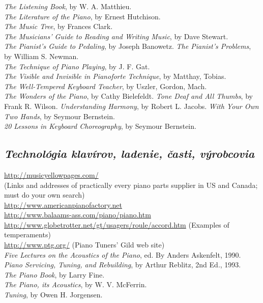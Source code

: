 \textit{The Listening Book}, by W. A. Matthieu.\\
\textit{The Literature of the Piano}, by Ernest Hutchison.\\
\textit{The Music Tree}, by Frances Clark.\\
\textit{The Musicians' Guide to Reading and Writing Music}, by Dave Stewart.\\
\textit{The Pianist's Guide to Pedaling}, by Joseph Banowetz.
\textit{The Pianist's Problems}, by William S. Newman.\\
\textit{The Technique of Piano Playing}, by J. F. Gat.\\
\textit{The Visible and Invisible in Pianoforte Technique}, by Matthay, Tobias.\\
\textit{The Well-Tempered Keyboard Teacher}, by Uszler, Gordon, Mach.\\
\textit{The Wonders of the Piano}, by Cathy Bielefeldt.
\textit{Tone Deaf and All Thumbs}, by Frank R. Wilson.
\textit{Understanding Harmony}, by Robert L. Jacobs.
\textit{With Your Own Two Hands}, by Seymour Bernstein.\\
\textit{20 Lessons in Keyboard Choreography}, by Seymour Bernstein.

\subsection*{\textit{Technológia klavírov, ladenie, časti, výrobcovia}}
\href{http://musicyellowpages.com/}{http://musicyellowpages.com/}\\
(Links and addresses of practically every piano parts supplier in US and Canada; must do your own search)\\
\href{http://www.americanpianofactory.net}{http://www.americanpianofactory.net}\\
\href{http://www.balaams-ass.com/piano/piano.htm}{http://www.balaams-ass.com/piano/piano.htm}\\
\href{http://www.globetrotter.net/gt/usagers/roule/accord.htm}{http://www.globetrotter.net/gt/usagers/roule/accord.htm} (Examples of temperaments)\\
\href{http://www.ptg.org/}{http://www.ptg.org/} (Piano Tuners' Gild web site)\\
\textit{Five Lectures on the Acoustics of the Piano}, ed. By Anders Askenfelt, 1990.\\
\textit{Piano Servicing, Tuning, and Rebuilding}, by Arthur Reblitz, 2nd Ed., 1993.\\
\textit{The Piano Book}, by Larry Fine.\\
\textit{The Piano, its Acoustics}, by W. V. McFerrin.\\
\textit{Tuning}, by Owen H. Jorgensen.

